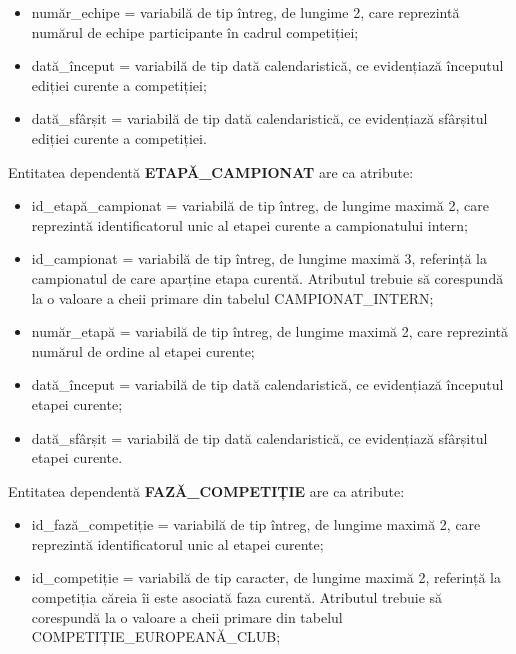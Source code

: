 \documentclass{article}
\begin{document}
\begin{spacing}{1.1}
\begin{itemize}
		\item număr\_echipe = variabilă de tip întreg, de lungime 2, care reprezintă numărul de echipe participante în cadrul competiției;
		
		\item dată\_început = variabilă de tip dată calendaristică, ce evidențiază începutul ediției curente a competiției;
		
		\item dată\_sfârșit = variabilă de tip dată calendaristică, ce evidențiază sfârșitul ediției curente a competiției.
	\end{itemize}
	
	\vspace{0.3cm}
	
	Entitatea dependentă \textbf{ETAPĂ\_CAMPIONAT} are ca atribute: 
	
	\begin{itemize}
		\item id\_etapă\_campionat = variabilă de tip întreg, de lungime maximă 2, care reprezintă identificatorul unic al etapei curente a campionatului intern;
		
		\item id\_campionat = variabilă de tip întreg, de lungime maximă 3, referință la campionatul de care aparține etapa curentă. Atributul trebuie să corespundă la o valoare a cheii primare din tabelul CAMPIONAT\_INTERN;
		
		\item număr\_etapă = variabilă de tip întreg, de lungime maximă 2, care reprezintă numărul de ordine al etapei curente;
		
		\item dată\_început = variabilă de tip dată calendaristică, ce evidențiază începutul etapei curente;
		
		\item dată\_sfârșit = variabilă de tip dată calendaristică, ce evidențiază sfârșitul etapei curente.
	\end{itemize}
	
	\vspace{0.3cm}
	
	Entitatea dependentă \textbf{FAZĂ\_COMPETIȚIE} are ca atribute:
	
	\begin{itemize}
		\item id\_fază\_competiție = variabilă de tip întreg, de lungime maximă 2, care reprezintă identificatorul unic al etapei curente;
		
		\item id\_competiție = variabilă de tip caracter, de lungime maximă 2, referință la competiția căreia îi este asociată faza curentă. Atributul trebuie să corespundă la o valoare a cheii primare din tabelul COMPETIȚIE\_EUROPEANĂ\_CLUB;
		

\end{itemize}
\end{spacing}
\end{document}
